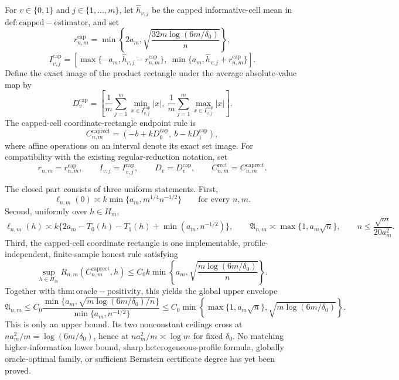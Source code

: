 For \(v\in\{0,1\}\) and \(j\in\{1,\ldots,m\}\), let \(\widehat h_{v,j}\) be the capped informative-cell mean in \(\mathrm{def:capped-estimator}\), and set
\[
 r^{\mathrm{cap}}_{n,m}
 =\min\left\{2a_m,\sqrt{\frac{32m\log(6m/\delta_0)}{n}}\right\},
\]
\[
 I^{\mathrm{cap}}_{v,j}
 =\left[
 \max\{-a_m,\widehat h_{v,j}-r^{\mathrm{cap}}_{n,m}\},
 \ \min\{a_m,\widehat h_{v,j}+r^{\mathrm{cap}}_{n,m}\}
 \right].
\]
Define the exact image of the product rectangle under the average absolute-value map by
\[
 D^{\mathrm{cap}}_v
 =\left[
 \frac1m\sum_{j=1}^{m}\min_{x\in I^{\mathrm{cap}}_{v,j}}|x|,
 \ \frac1m\sum_{j=1}^{m}\max_{x\in I^{\mathrm{cap}}_{v,j}}|x|
 \right].
\]
The capped-cell coordinate-rectangle endpoint rule is
\[
 C^{\mathrm{caprect}}_{n,m}
 =\left(-b+kD^{\mathrm{cap}}_0,\ b-kD^{\mathrm{cap}}_1\right),
\]
where affine operations on an interval denote its exact set image. For compatibility with the existing regular-reduction notation, set
\[
 r_{n,m}=r^{\mathrm{cap}}_{n,m},\qquad
 I_{v,j}=I^{\mathrm{cap}}_{v,j},\qquad
 D_v=D^{\mathrm{cap}}_v,\qquad
 C^{\mathrm{rect}}_{n,m}=C^{\mathrm{caprect}}_{n,m}.
\]

The closed part consists of three uniform statements. First,
\[
 \ell_{n,m}(0)\asymp
 k\min\{a_m,m^{1/4}n^{-1/2}\}
 \qquad\text{for every }n,m.
\]
Second, uniformly over \(h\in H_m\),
\[
 \ell_{n,m}(h)\asymp
 k\{2a_m-T_0(h)-T_1(h)+\min(a_m,n^{-1/2})\},
 \qquad
 \mathfrak A_{n,m}\asymp\max\{1,a_m\sqrt n\},
 \qquad
 n\leq\frac{\sqrt m}{20a_m^2}.
\]
Third, the capped-cell coordinate rectangle is one implementable, profile-independent, finite-sample honest rule satisfying
\[
 \sup_{h\in H_m}
 R_{n,m}(C^{\mathrm{caprect}}_{n,m},h)
 \leq
 C_0k\min\left\{
 a_m,\sqrt{\frac{m\log(6m/\delta_0)}{n}}
 \right\}.
\]
Together with \(\mathrm{thm:oracle-positivity}\), this yields the global upper envelope
\[
 \mathfrak A_{n,m}
 \leq
 C_0
 \frac{\min\{a_m,\sqrt{m\log(6m/\delta_0)/n}\}}
      {\min\{a_m,n^{-1/2}\}}
 \leq
 C_0\min\left\{
 \max\{1,a_m\sqrt n\},
 \sqrt{m\log(6m/\delta_0)}
 \right\}.
\]
This is only an upper bound. Its two nonconstant ceilings cross at
\(na_m^2/m=\log(6m/\delta_0)\), hence at
\(na_m^2/m\asymp\log m\) for fixed \(\delta_0\). No matching
higher-information lower bound, sharp heterogeneous-profile formula,
globally oracle-optimal family, or sufficient Bernstein certificate
degree has yet been proved.

